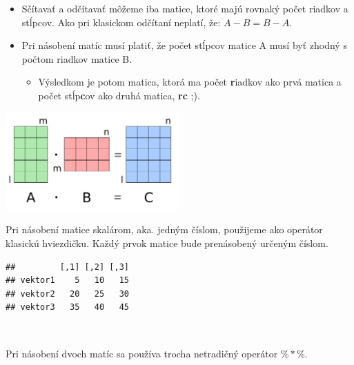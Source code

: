 \begin{itemize}
\tightlist
\item
  Sčítavať a odčítavať môžeme iba matice, ktoré majú rovnaký počet
  riadkov a stĺpcov. Ako pri klasickom odčítaní neplatí, že:
  \(A - B = B - A\).
\item
  Pri násobení matíc musí platiť, že počet stĺpcov matice A musí byť
  zhodný s počtom riadkov matice B.

  \begin{itemize}
  \tightlist
  \item
    Výsledkom je potom matica, ktorá ma počet \textbf{r}iadkov ako prvá
    matica a počet stĺp\textbf{c}ov ako druhá matica, \textbf{rc} ;).
  \end{itemize}
\end{itemize}

\begin{center}

\includegraphics[width=0.5\textwidth,height=\textheight]{diplomka obrazky/4a.png}

\end{center}

Pri násobení matice skalárom, aka. jedným číslom, použijeme ako operátor
klasickú hviezdičku. Každý prvok matice bude prenásobený určeným číslom.

\begin{Shaded}
\begin{Highlighting}[]
\OperatorTok{*}\StringTok{ }
\end{Highlighting}
\end{Shaded}

\begin{verbatim}
##         [,1] [,2] [,3]
## vektor1    5   10   15
## vektor2   20   25   30
## vektor3   35   40   45
\end{verbatim}

~

Pri násobení dvoch matíc sa používa trocha netradičný operátor
\(\%*\%\).

\begin{Shaded}
\end{Shaded}


